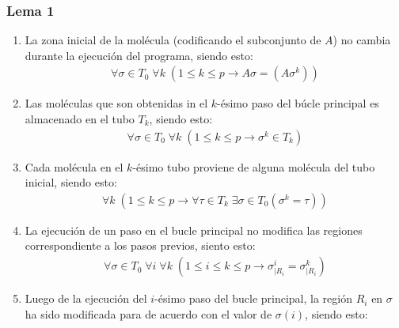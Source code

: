 \documentclass[12pt, letterpaper, twoside]{article}
\begin{document}
    \subsubsection{Lema 1}
    \begin{enumerate}
        \item La zona inicial de la molécula (codificando el subconjunto de $A$) no cambia durante la ejecución del programa, siendo esto:
        \begin{equation}
            \begin{aligned}
                \forall\sigma\in{T_0}\;\forall{k}\;(1\leq{k}\leq{p}\rightarrow{A\sigma}=(A\sigma^{k}))
            \end{aligned}
        \end{equation}
        \item Las moléculas que son obtenidas in el $k$-ésimo paso del búcle principal es almacenado en el tubo $T_k$, siendo esto:
        \begin{equation}
            \begin{aligned}
                \forall\sigma\in{T_0}\;\forall{k}\;(1\leq{k}\leq{p}\rightarrow\sigma^{k}\in{T_k})
            \end{aligned}
        \end{equation}
        \item Cada molécula en el $k$-ésimo tubo proviene de alguna molécula del tubo inicial, siendo esto:
        \begin{equation}
            \begin{aligned}
                \forall{k}\;(1\leq{k}\leq{p}\rightarrow\forall\tau\in{T_k}\;\exists\sigma\in{T_0}(\sigma^k=\tau))
            \end{aligned}
        \end{equation}
        \item La ejecución de un paso en el bucle principal no modifica las regiones correspondiente a los pasos previos, siento esto:
        \begin{equation}
            \begin{aligned}
                \forall\sigma\in{T_0}\;\forall{i}\;\forall{k}\;(1\leq{i}\leq{k}\leq{p}\rightarrow\sigma^{i}_{|R_i}=\sigma^{k}_{|R_i})
            \end{aligned}
        \end{equation}
        \item Luego de la ejecución del $i$-ésimo paso del bucle principal, la región $R_i$ en $\sigma$ ha sido modificada para de acuerdo con el valor de $\sigma(i)$, siendo esto:

\end{enumerate}
\end{document}
